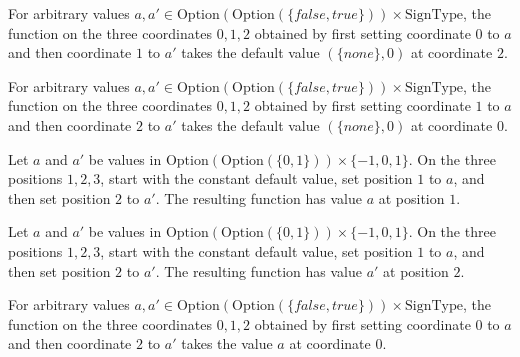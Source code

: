 \begin{theorem}
\label{Complexity.Meyer.two_01_2}
\leanok
{}
For arbitrary values $a,a' \in \mathrm{Option}(\mathrm{Option}(\{false,true\}))\times \mathrm{SignType}$, the
function on the three coordinates $0,1,2$ obtained by first setting coordinate $0$ to
$a$ and then coordinate $1$ to $a'$ takes the default value $(\{none\},0)$ at coordinate
$2$.
\end{theorem}

\begin{theorem}
\label{Complexity.Meyer.two_12_0}
\leanok
{}
For arbitrary values $a,a' \in \mathrm{Option}(\mathrm{Option}(\{false,true\}))\times \mathrm{SignType}$, the
function on the three coordinates $0,1,2$ obtained by first setting coordinate $1$ to
$a$ and then coordinate $2$ to $a'$ takes the default value $(\{none\},0)$ at coordinate
$0$.
\end{theorem}

\begin{theorem}
\label{Complexity.Meyer.two_12_1}
\leanok
{}
Let $a$ and $a'$ be values in $\mathrm{Option}(\mathrm{Option}(\{0,1\}))\times\{
-1,0,1\}$. On the three positions $1,2,3$, start with the constant default value, set
position $1$ to $a$, and then set position $2$ to $a'$. The resulting function has value
$a$ at position $1$.
\end{theorem}

\begin{theorem}
\label{Complexity.Meyer.two_12_2}
\leanok
{}
Let $a$ and $a'$ be values in $\mathrm{Option}(\mathrm{Option}(\{0,1\}))\times\{
-1,0,1\}$. On the three positions $1,2,3$, start with the constant default value, set
position $1$ to $a$, and then set position $2$ to $a'$. The resulting function has value
$a'$ at position $2$.
\end{theorem}

\begin{theorem}
\label{Complexity.Meyer.two_02_0}
\leanok
{}
For arbitrary values $a,a' \in \mathrm{Option}(\mathrm{Option}(\{false,true\}))\times \mathrm{SignType}$, the
function on the three coordinates $0,1,2$ obtained by first setting coordinate $0$ to
$a$ and then coordinate $2$ to $a'$ takes the value $a$ at coordinate $0$.
\end{theorem}

